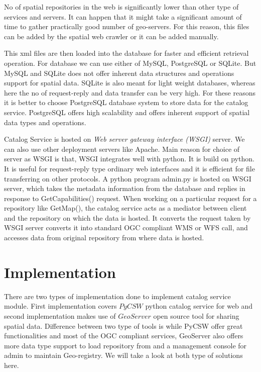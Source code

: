 
\par No of spatial repositories in the web is significantly lower than other type of services and servers. It can happen that it might take a significant amount of time to gather practically good number of geo-servers. For this reason, this files can be added by the spatial web crawler or it can be added manually.
\newline
\par This xml files are then loaded into the database for faster and efficient retrieval operation. For database we can use either of MySQL, PostgreSQL or SQLite. But MySQL and SQLite does not offer inherent data structures and operations support for spatial data. SQLite is also meant for light weight databases, whereas here the no of request-reply and data transfer can be very high. For these reasons it is better to choose PostgreSQL database system to store data for the catalog service. PostgreSQL offers high scalability and offers inherent support of spatial data types and operations.\newline
\par Catalog Service is hosted on \textit{Web server gateway interface (WSGI)} server. We can also use other deployment servers like Apache. Main reason for choice of server as WSGI is that, WSGI integrates well with python. It is build on python. It is useful for request-reply type ordinary web interfaces and it is efficient for file transferring on other protocols. A python program admin.py is hosted on WSGI server, which takes the metadata information from the database and replies in response to GetCapabilities() request. When working on a particular request for a repository like GetMap(), the catalog service acts as a mediator between client and the repository on which the data is hosted. It converts the request taken by WSGI server converts it into standard OGC compliant WMS or WFS call, and accesses data from original repository from where data is hosted.


\section{Implementation}
There are two types of implementation done to implement catalog service module. First implementation covers $PyCSW$ python catalog service for web and second implementation makes use of $GeoServer$ open source tool for sharing spatial data. Difference between two type of tools is while PyCSW offer great functionalities and most of the OGC compliant services, GeoServer also offers more data type support to load repository from and a management console for admin to maintain Geo-registry. We will take a look at both type of solutions here.

